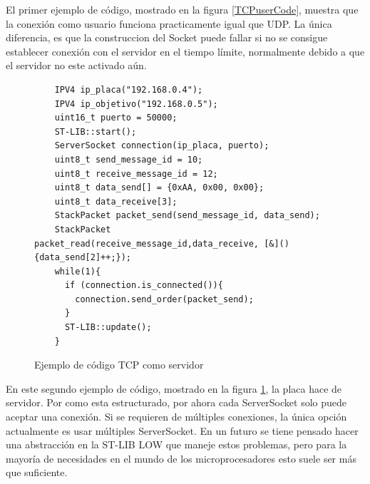 \documentclass{report}
\begin{document}
\par \vspace{0.3cm}

El primer ejemplo de código, mostrado en la figura \ref{TCPuserCode}, muestra que la conexión como usuario funciona practicamente igual que UDP. La única diferencia, es que la construccion del Socket puede fallar si no se consigue establecer conexión con el servidor en el tiempo límite, normalmente debido a que el servidor no este activado aún. 

 \begin{figure}[H]
  \begin{lstlisting}
    IPV4 ip_placa("192.168.0.4");
    IPV4 ip_objetivo("192.168.0.5");
    uint16_t puerto = 50000;
    ST-LIB::start();
    ServerSocket connection(ip_placa, puerto);
    uint8_t send_message_id = 10;
    uint8_t receive_message_id = 12;
    uint8_t data_send[] = {0xAA, 0x00, 0x00}; 
    uint8_t data_receive[3]; 
    StackPacket packet_send(send_message_id, data_send);
    StackPacket packet_read(receive_message_id,data_receive, [&](){data_send[2]++;});
    while(1){
      if (connection.is_connected()){
        connection.send_order(packet_send);
      }
      ST-LIB::update();
    }
  \end{lstlisting}
  \caption{Ejemplo de código TCP como servidor}
  \label{TCPserverCode}
\end{figure}

\par \vspace{0.3cm}

En este segundo ejemplo de código, mostrado en la figura \ref{TCPserverCode}, la placa hace de servidor. Por como esta estructurado, por ahora cada ServerSocket solo puede aceptar una conexión. Si se requieren de múltiples conexiones, la única opción actualmente es usar múltiples ServerSocket. En un futuro se tiene pensado hacer una abstracción en la ST-LIB LOW que maneje estos problemas, pero para la mayoría de necesidades en el mundo de los microprocesadores esto suele ser más que suficiente. 
\end{document}

